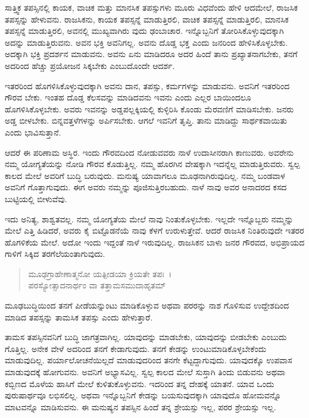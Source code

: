 ಸಾತ್ತ್ವಿಕ ತಪಸ್ಸಿನಲ್ಲಿ ಕಾಯಕ, ವಾಚಿಕ ಮತ್ತು ಮಾನಸಿಕ ತಪಸ್ಸುಗಳು ಮೂರು ವಿಧವೆಂದು ಹೇಳಿ ಆದಮೇಲೆ, ರಾಜಸಿಕ ತಪಸ್ಸನ್ನು ಹೇಳುವನು. ರಾಜಸಿಕನು, ಕಾಯಕ ತಪಸ್ಸನ್ನೆ ಮಾಡುತ್ತಿರಲಿ, ವಾಚಿಕ ತಪಸ್ಸನ್ನೆ ಮಾಡುತ್ತಿರಲಿ, ಮಾನಸಿಕ ತಪಸ್ಸನ್ನೆ ಮಾಡುತ್ತಿರಲಿ, ಅವನಲ್ಲಿ ಮುಖ್ಯವಾಗಿರು ವುದು ಢಂಬಾಚಾರ. ಇನ್ನೊಬ್ಬನಿಗೆ ತೋರಿಸಿಕೊಳ್ಳುವುದಕ್ಕಾಗಿ ಅದನ್ನು ಮಾಡುತ್ತಿರುವನು. ಅವನ ಭಕ್ತಿ ಅವನಿಗಲ್ಲ. ಅವನು ದೊಡ್ಡ ಭಕ್ತ ಎಂದು ಜನರಿಂದ ಹೇಳಿಸಿಕೊಳ್ಳಬೇಕು. ಅದಕ್ಕಾಗಿ ಭಕ್ತಿ ಪ್ರದರ್ಶನ ಮಾಡುವನು. ಅವನು ಏನು ಮಾಡಿದರೂ ಅದರ ಹಿಂದೆ ತಾನು ಪ್ರಖ್ಯಾತನಾಗಬೇಕು, ತನಗೆ ಅದರಿಂದ ಹೆಚ್ಚು ಪ್ರಯೋಜನ ಸಿಕ್ಕಬೇಕು ಎಂಬುದೊಂದೇ ಆದರ್ಶ.

ಇತರರಿಂದ ಹೊಗಳಿಸಿಕೊಳ್ಳುವುದಕ್ಕಾಗಿ ಅವನು ದಾನ, ತಪಸ್ಸು, ಕರ್ಮಗಳನ್ನು ಮಾಡುವನು. ಅವನಿಗೆ ಇತರರಿಂದ ಗೌರವ ಬೇಕು. ಇಂತಹ ದೊಡ್ಡ ಕೆಲಸವನ್ನು ಮಾಡಿದವನು ಇವನು ಎಂದು ಎಲ್ಲರ ಬಾಯಿಂದಲೂ ಹೊಗಳಿಸಿಕೊಳ್ಳಬೇಕು. ಅವರು ಇವನನ್ನು ಅಡ್ಡಪಲ್ಲಕ್ಕಿಯಲ್ಲಿ ಕುಳ್ಳಿರಿಸಿ ಕೊಂಡು ಮೆರವಣಿಗೆ ಮಾಡಿಸಬೇಕು. ಜನರು ಅಡ್ಡ ಬೀಳಬೇಕು. ಬಿನ್ನವತ್ತಳೆಗಳನ್ನು ಅರ್ಪಿಸಬೇಕು. ಆಗಲೆ ಇವನಿಗೆ ತೃಪ್ತಿ. ತಾನು ಮಾಡಿದ್ದು ಸಾರ್ಥಕವಾಯಿತು ಎಂದು ಭಾವಿಸುತ್ತಾನೆ.

ಆದರೆ ಈ ಪರಿಣಾಮ ಅಸ್ಥಿರ. ಇಂದು ಗೌರವದಿಂದ ನೋಡುವವರು ನಾಳೆ ಉದಾಸೀನರಾಗಿ ಕಾಣುವರು. ಅವರೇನು ನಮ್ಮ ಯೋಗ್ಯತೆಯನ್ನು ನೋಡಿ ಗೌರವ ಕೊಡುತ್ತಿಲ್ಲ. ನಮ್ಮ ಹೊರಗಿನ ವೇಷಕ್ಕಾಗಿ ಇದನ್ನೆಲ್ಲ ಮಾಡುತ್ತಿರುವರು. ಸ್ವಲ್ಪ ಕಾಲದ ಮೇಲೆ ಅವರಿಗೆ ಬುದ್ಧಿ ಬರುವುದು. ಮನುಷ್ಯ ಯಾವಾಗಲೂ ಮೂಢನಾಗಿರುವುದಿಲ್ಲ. ನಮ್ಮ ಬಂಡವಾಳ ಅವನಿಗೆ ಗೊತ್ತಾಗುವುದು. ಈಗ ಅವರು ನಮ್ಮನ್ನು ಪೂಜಿಸುತ್ತಿರಬಹುದು. ನಾಳೆ ನಾವು ಅವರ ಅನಾದರದ ಕಸದ ಬುಟ್ಟಿಯಲ್ಲಿ ಬೀಳುವೆವು.

ಇದು ಅನಿತ್ಯ, ಶಾಶ್ವತವಲ್ಲ. ನಮ್ಮ ಯೋಗ್ಯತೆಯ ಮೇಲೆ ನಾವು ನಿಂತುಕೊಳ್ಳಬೇಕು. ಇಲ್ಲದೇ ಇನ್ನೊಬ್ಬರು ನಮ್ಮನ್ನು ಮೇಲೆ ಎತ್ತಿ ಹಿಡಿದರೆ, ಅವರು ಕೈ ಬಿಟ್ಟೊಡನೆಯೆ ನಾವು ಕೆಳಗೆ ಉರುಳುತ್ತೇವೆ. ಆದರೆ ರಾಜಸಿಕ ನಿಂತಿರುವುದೇ ಇತರರ ಹೊಗಳಿಕೆಯ ಮೇಲೆ. ಅದೋ ಇಂದು ಇದ್ದಂತೆ ನಾಳೆ ಇರುವುದಿಲ್ಲ. ರಾಜಸಿಕನ ಬಾಳು ಜನರ ಗೌರವದ, ಅಭಿಪ್ರಾಯದ ಗಾಳಿಗೆ ಸಿಕ್ಕಿದ ತರಗೆಲೆಯಂತಾಗುವುದು.

\begin{verse}
ಮೂಢಗ್ರಾಹೇಣಾತ್ಮನೋ ಯತ್ಪೀಡಯಾ ಕ್ರಿಯತೇ ತಪಃ~।\\ಪರಸ್ಯೋತ್ಸಾದನಾರ್ಥಂ ವಾ ತತ್ತಾಮಸಮುದಾಹೃತಮ್ 
\end{verse}

{\small ಮೂಢಬುದ್ಧಿಯಿಂದ ತನಗೆ ಪೀಡೆಯನ್ನುಂಟು ಮಾಡಿಕೊಳ್ಳುವ ಅಥವಾ ಪರರನ್ನು ನಾಶ ಗೊಳಿಸುವ ಉದ್ದೇಶದಿಂದ ಮಾಡಿದ ತಪಸ್ಸನ್ನು ತಾಮಸಿಕ ತಪಸ್ಸು ಎಂದು ಹೇಳುತ್ತಾರೆ.}

ತಾಮಸ ತಪಸ್ಸಿನವನಿಗೆ ಬುದ್ಧಿ ಜಾಗತ್ರವಾಗಿಲ್ಲ. ಯಾವುದನ್ನು ಮಾಡಬೇಕು, ಯಾವುದನ್ನು ಬೀಡಬೇಕು ಎಂಬುದು ಗೊತ್ತಿಲ್ಲ. ಅನೇಕ ವೇಳೆ ಅದರಿಂದ ತನಗೆ ಕೇಡಾಗುವುದು. ತನಗೆ ಕೇಡನ್ನು ಉಂಟುಮಾಡಿಕೊಳ್ಳಬೇಕೆಂದು ಮಾಡುವುದಿಲ್ಲ. ಪರ್ಯಾಲೋಚನೆಯಿಲ್ಲದೆ ಮಾಡುವುದರಿಂದ ತನಗೇ ಕೆಟ್ಟದ್ದಾಗುವುದು. ಯಾವುದಕ್ಕೊ ಉಪವಾಸ ಮಾಡುವುದಕ್ಕೆ ಹೋಗುವನು. ಅವನಿಗೆ ಅಭ್ಯಾಸವಿಲ್ಲ. ಸ್ವಲ್ಪ ಕಾಲದ ಮೇಲೆ ಸುಸ್ತಾಗಿ ತಿಂದು ಬಿಡುವನು ಅಥವಾ ಕಬ್ಬಿಣದ ಮೊಳೆಯ ಹಾಸಿಗೆ ಮೇಲೆ ಕುಳಿತುಕೊಳ್ಳುವನು. ಇದರಿಂದ ತನ್ನ ದೇಹಕ್ಕೆ ಯಾತನೆ. ಯಾವ ಒಂದು ಪುರುಷಾರ್ಥವೂ ಲಭಿಸಲಿಲ್ಲ. ಅಥವಾ ಇನ್ನೊಬ್ಬನಿಗೆ ಕೇಡನ್ನು ಬಯಸುವುದಕ್ಕಾಗಿ ಯಾವುದೊ ಹೋಮವನ್ನೊ ಮಾಟವನ್ನೊ ಮಾಡಿಸುವನು. ಈ ಮನುಷ್ಯನ ತಪಸ್ಸಿನ ಹಿಂದೆ ತನ್ನ ಶ್ರೇಯಸ್ಸು ಇಲ್ಲ, ಪರರ ಶ್ರೇಯಸ್ಸು ಇಲ್ಲ.

